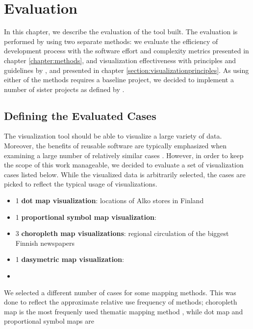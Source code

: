 
\chapter{Evaluation}
\label{chapter:evaluation}

In this chapter, we describe the evaluation of the tool built. The evaluation is performed by using two separate methods: we evaluate the efficiency of development process with the software effort and complexity metrics presented in chapter \ref{chapter:methods}, and visualization effectiveness with principles and guidelines by \citet{tufte_visual_1986}, \citet{azzam_j-b_2013} and \citet{kraak_cartographic_1998} presented in chapter \ref{section:visualizationprinciples}. As using either of the methods requires a baseline project, we decided to implement a number of sister projects as defined by \citet{kitchenham_evaluating_1998}.

\section{Defining the Evaluated Cases}

The visualization tool should be able to visualize a large variety of data. Moreover, the benefits of reusable software are typically emphasized when examining a large number of relatively similar cases \citep{frakes_software_1996}. However, in order to keep the scope of this work manageable, we decided to evaluate a set of visualization cases listed below. While the visualized data is arbitrarily selected, the cases are picked to reflect the typical usage of visualizations.

\begin{itemize}
	\item 1 \textbf{dot map visualization}: locations of Alko stores in Finland
	\item 1 \textbf{proportional symbol map visualization}: 
	\item 3 \textbf{choropleth map visualizations}: regional circulation of the biggest Finnish newspapers
	\item 1 \textbf{dasymetric map visualization}: 
	\item {}
\end{itemize}

We selected a different number of cases for some mapping methods. This was done to reflect the approximate relative use frequency of methods; choropleth map is the most frequenly used thematic mapping method \citet[chap.~14]{slocum_thematic_2014}, while dot map and proportional symbol maps are 

